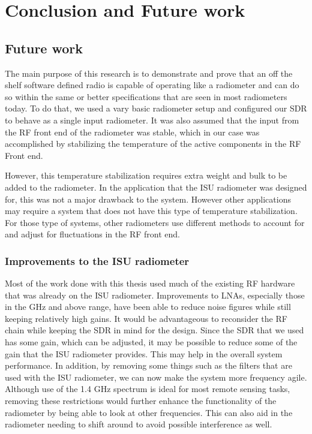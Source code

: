 \chapter{Conclusion and Future work}

\section{Future work}
The main purpose of this research is to demonstrate and prove that an off the shelf software defined radio is capable of operating like a radiometer and can do so within the same or better specifications that are seen in most radiometers today.  To do that, we used a vary basic radiometer setup and configured our SDR to behave as a single input radiometer.  It was also assumed that the input from the RF front end of the radiometer was stable, which in our case was accomplished by stabilizing the temperature of the active components in the RF Front end.

However, this temperature stabilization requires extra weight and bulk to be added to the radiometer.  In the application that the ISU radiometer was designed for, this was not a major drawback to the system.  However other applications may require a system that does not have this type of temperature stabilization.  For those type of systems, other radiometers use different methods to account for and adjust for fluctuations in the RF front end. 

\subsection{Improvements to the ISU radiometer}

Most of the work done with this thesis used much of the existing RF hardware that was already on the ISU radiometer.  Improvements to LNAs, especially those in the GHz and above range, have been able to reduce noise figures while still keeping relatively high gains.  It would be advantageous to reconsider the RF chain while keeping the SDR in mind for the design.  Since the SDR that we used has some gain, which can be adjusted, it may be possible to reduce some of the gain that the ISU radiometer provides. This may help in the overall system performance.  In addition, by removing some things such as the filters that are used with the ISU radiometer, we can now make the system more frequency agile.  Although use of the 1.4 GHz spectrum is ideal for most remote sensing tasks, removing these restrictions would further enhance the functionality of the radiometer by being able to look at other frequencies.  This can also aid in the radiometer needing to shift around to avoid possible interference as well.  

